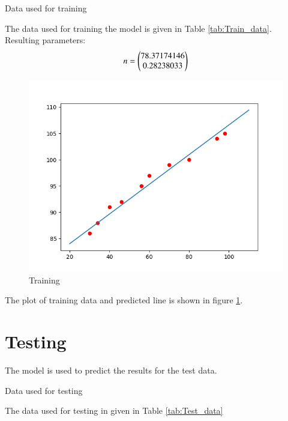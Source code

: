 \documentclass[journal,12pt,twocolumn]{IEEEtran}
\begin{document}
	\begin{table}[h!]
	\centering
	       
	       \caption{Data used for training}
	       \label{tab:Train_data}
	\end{table}

	The data used for training the model is given in Table \ref{tab:Train_data}.
	Resulting parameters:
	\begin{align}
		n = \begin{pmatrix}78.37174146 \\ 0.28238033\end{pmatrix}
	\end{align}

	\begin{figure}[h!]
	  \centering
	   \includegraphics[width=\linewidth]{figs/Training_GD.png}
	   \caption{Training}	\label{fig:Train}
	\end{figure}
	
	The plot of training data and predicted line is shown in figure \ref{fig:Train}.

\section{Testing}
	The model is used to predict the results for the test data.
	\begin{table}[h!]
        \centering 
               
               \caption{Data used for testing}    
               \label{tab:Test_data}
        \end{table}

	The data used for testing in given in Table \ref{tab:Test_data}
	
\end{document}
